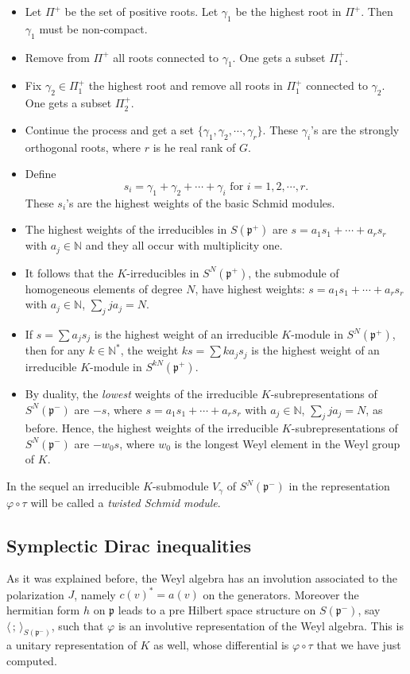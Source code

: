 \documentclass{amsart}[draft,11pt]
\newcommand{\fp}{{\mathfrak{p}}}
\numberwithin{equation}{section}
\theoremstyle{definition}
\begin{document}
 
\begin{itemize}
\item Let $\Pi^+$ be the set of positive roots. Let $\gamma_1$ be the highest root in $\Pi^+$. Then $\gamma_1$ must be non-compact. 
\item Remove from $\Pi^+$ all roots connected to $\gamma_1$. One gets a subset $\Pi^+_1$. 
\item Fix $\gamma_2\in\Pi^+_1$ the highest root and remove all roots in $\Pi^+_1$ connected to $\gamma_2$. One gets a subset $\Pi^+_2$.
\item Continue the process and get a set $\{\gamma_1,\gamma_2,\cdots,\gamma_r\}$. These $\gamma_i$'s are the strongly orthogonal roots, where $r$ is he real rank of $G$. 
\item Define 
\begin{equation}\label{e:Schmid}
s_i=\gamma_1+\gamma_2+\cdots+\gamma_i \text{ for } i=1,2,\cdots,r.
\end{equation}
These $s_i$'s are the highest weights of the basic Schmid modules.
\item The highest weights of the irreducibles in $S({\mathfrak p}^+)$ are $s=a_1s_1+\cdots+a_rs_r$ with $a_j\in{\mathbb N}$ and they all occur with multiplicity one.
\item It follows that the $K$-irreducibles in $S^N({\mathfrak p}^+)$, the submodule of homogeneous elements of degree $N$, have highest weights: $s=a_1s_1+\cdots+a_rs_r$ with $a_j\in{\mathbb N}$,
$\sum_j j a_j=N$.
\item If $s=\sum a_j s_j$ is the highest weight of an irreducible
$K$-module in $S^N(\fp^+)$, then for any $k\in \mathbb{N}^*$, the
weight $ks=\sum k a_j s_j$ is the highest weight
of an irreducible
$K$-module in $S^{kN}(\fp^+)$.
\item By duality, the {\it lowest} weights of the irreducible $K$-subrepresentations of $S^N(\fp^-)$ are $-s$, where $s=a_1s_1+\cdots+a_rs_r$ with $a_j\in{\mathbb N}$,
$\sum_j j a_j=N$, as before. Hence, the highest weights of the irreducible $K$-subrepresentations of $S^N(\fp^-)$ are $-w_0s$, where $w_0$ is the longest Weyl element in the Weyl group of $K$.
\end{itemize}
In the sequel an irreducible $K$-submodule $V_\gamma$
of $S^N(\fp^-)$ in the representation $\varphi \circ \tau$ will be called a \emph{twisted Schmid module}.

\subsection{Symplectic Dirac inequalities}
As it was explained before,
the Weyl algebra has an involution 
associated to the polarization $J$,
namely $c(v)^*=a(v)$ on the generators. Moreover the hermitian
form $h$ on $\fp$ leads to a pre Hilbert space structure on $S(\fp^-)$, say $\langle\,;\,\rangle_{S(\fp^-)}$, such that $\varphi$ is an involutive 
representation of the Weyl algebra.
This is a unitary representation of $K$ as well, whose differential is
$\varphi \circ \tau$ that we have just computed.
\end{document}
